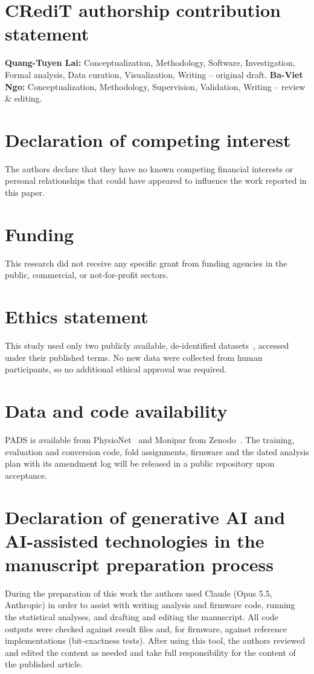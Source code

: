 \documentclass[preprint,12pt]{elsarticle}
\begin{document}
\section*{CRediT authorship contribution statement}
\textbf{Quang-Tuyen Lai:} Conceptualization, Methodology, Software, Investigation, Formal analysis, Data curation, Visualization, Writing -- original draft. \textbf{Ba-Viet Ngo:} Conceptualization, Methodology, Supervision, Validation, Writing -- review \& editing.

\section*{Declaration of competing interest}
The authors declare that they have no known competing financial interests or personal relationships that could have appeared to influence the work reported in this paper.

\section*{Funding}
This research did not receive any specific grant from funding agencies in the public, commercial, or not-for-profit sectors.

\section*{Ethics statement}
This study used only two publicly available, de-identified datasets~\cite{PADSdata,MoniparData}, accessed under their published terms. No new data were collected from human participants, so no additional ethical approval was required.

\section*{Data and code availability}
PADS is available from PhysioNet~\cite{PADSdata} and Monipar from Zenodo~\cite{MoniparData}. The training, evaluation and conversion code, fold assignments, firmware and the dated analysis plan with its amendment log will be released in a public repository upon acceptance.

\section*{Declaration of generative AI and AI-assisted technologies in the manuscript preparation process}
During the preparation of this work the authors used Claude (Opus 5.5, Anthropic) in order to assist with writing analysis and firmware code, running the statistical analyses, and drafting and editing the manuscript. All code outputs were checked against result files and, for firmware, against reference implementations (bit-exactness tests). After using this tool, the authors reviewed and edited the content as needed and take full responsibility for the content of the published article.



\end{document}
